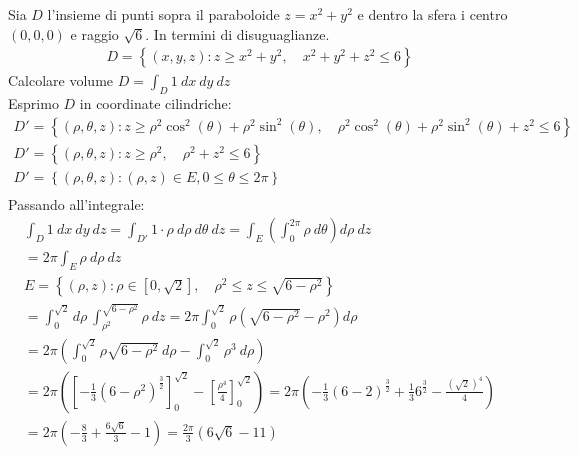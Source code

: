 \documentclass[a4paper, oneside]{article}
\begin{document}
\begin{example}
  Sia $D$ l'insieme di punti sopra il paraboloide $z=x^2 + y^2$ e dentro la sfera i centro $(0,0,0)$ e raggio $\sqrt{6}$. In termini di disuguaglianze.
  \begin{gather*}
    D = \left\{ (x,y,z): z \geq x^2+y^2, \quad x^2+y^2+z^2 \leq 6 \right\} 
  \end{gather*}
  Calcolare volume $D = \int_D 1 \ dx \ dy \ dz$\\
  Esprimo $D$ in coordinate cilindriche:
  \begin{gather*}
    D' = \left\{ (\rho, \theta , z) : z \geq \rho^2\cos^2(\theta) + \rho^2 \sin^2(\theta) , \quad \rho^2\cos^2(\theta) + \rho^2 \sin^2(\theta) + z^2 \leq 6 \right\} \\
    D' = \left\{ (\rho, \theta , z) : z \geq \rho^2 , \quad \rho^2 + z^2 \leq 6 \right\} \\
    D' = \left\{ (\rho, \theta , z) : (\rho, z) \in E, 0 \leq \theta \leq 2\pi \right\} \\
  \end{gather*}
  Passando all'integrale:
  \begin{gather*}
    \int_D 1 \ dx \ dy \ dz = \int_{D'} 1 \cdot \rho \ d\rho \ d\theta \ dz = \int_E \left( \int_0^{2\pi} \rho \ d\theta \right) d\rho \ dz \\
    = 2\pi \int_E \rho \ d\rho \ dz\\
    E= \left\{ (\rho,z) : \rho \in [0,\sqrt{2}] , \quad \rho^2 \leq z \leq \sqrt{6-\rho^2} \right\} \\
    = \int_0^{\sqrt{2}} d\rho \ \int_{\rho^2}^{\sqrt{6-\rho^2}} \rho \ dz = 2\pi \int_0^{\sqrt{2}} \rho \left( \sqrt{6-\rho^2} - \rho^2 \right) d\rho \\
    = 2\pi \left( \int_0^{\sqrt{2}} \rho \sqrt{6-\rho^2} \ d\rho - \int_0^{\sqrt{2}} \rho^3 \ d\rho \right) \\
    = 2\pi \left( \left[ -\frac{1}{3} (6-\rho^2)^{\frac{3}{2}} \right]_0^{\sqrt{2}} - \left[ \frac{\rho^4}{4} \right]_0^{\sqrt{2}} \right) = 2\pi \left( -\frac{1}{3} (6-2)^{\frac{3}{2}} + \frac{1}{3} 6^{\frac{3}{2}} - \frac{(\sqrt{2})^4}{4} \right) \\
    = 2\pi \left( -\frac{8}{3} + \frac{6\sqrt{6}}{3} - 1 \right) = \frac{2\pi}{3} (6\sqrt{6} - 11) \\
  \end{gather*}
  \end{example}
\end{document}
